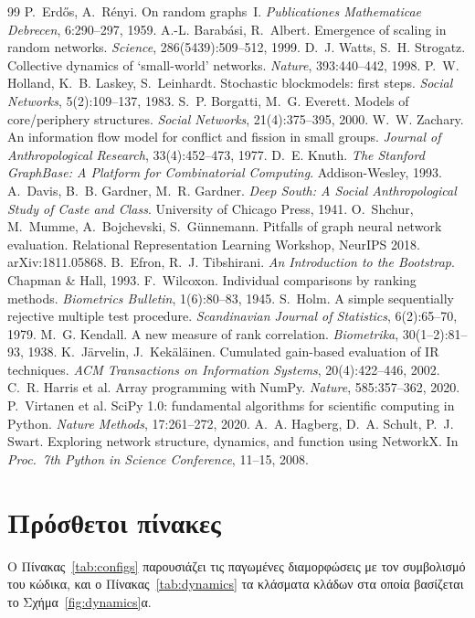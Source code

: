 \documentclass[11pt,a4paper]{article}
\theoremstyle{definition}
\theoremstyle{plain}
\begin{document}
\begin{thebibliography}{99}
 P.~Erdős, A.~Rényi. On random graphs~I. \emph{Publicationes Mathematicae Debrecen}, 6:290--297, 1959.
 A.-L. Barabási, R.~Albert. Emergence of scaling in random networks. \emph{Science}, 286(5439):509--512, 1999.
 D.~J. Watts, S.~H. Strogatz. Collective dynamics of `small-world' networks. \emph{Nature}, 393:440--442, 1998.
 P.~W. Holland, K.~B. Laskey, S.~Leinhardt. Stochastic blockmodels: first steps. \emph{Social Networks}, 5(2):109--137, 1983.
 S.~P. Borgatti, M.~G. Everett. Models of core/periphery structures. \emph{Social Networks}, 21(4):375--395, 2000.
 W.~W. Zachary. An information flow model for conflict and fission in small groups. \emph{Journal of Anthropological Research}, 33(4):452--473, 1977.
 D.~E. Knuth. \emph{The Stanford GraphBase: A Platform for Combinatorial Computing}. Addison-Wesley, 1993.
 A.~Davis, B.~B. Gardner, M.~R. Gardner. \emph{Deep South: A Social Anthropological Study of Caste and Class}. University of Chicago Press, 1941.
 O.~Shchur, M.~Mumme, A.~Bojchevski, S.~Günnemann. Pitfalls of graph neural network evaluation. Relational Representation Learning Workshop, NeurIPS 2018. arXiv:1811.05868.
 B.~Efron, R.~J. Tibshirani. \emph{An Introduction to the Bootstrap}. Chapman \& Hall, 1993.
 F.~Wilcoxon. Individual comparisons by ranking methods. \emph{Biometrics Bulletin}, 1(6):80--83, 1945.
 S.~Holm. A simple sequentially rejective multiple test procedure. \emph{Scandinavian Journal of Statistics}, 6(2):65--70, 1979.
 M.~G. Kendall. A new measure of rank correlation. \emph{Biometrika}, 30(1--2):81--93, 1938.
 K.~Järvelin, J.~Kekäläinen. Cumulated gain-based evaluation of IR techniques. \emph{ACM Transactions on Information Systems}, 20(4):422--446, 2002.
 C.~R. Harris et al. Array programming with NumPy. \emph{Nature}, 585:357--362, 2020.
 P.~Virtanen et al. SciPy 1.0: fundamental algorithms for scientific computing in Python. \emph{Nature Methods}, 17:261--272, 2020.
 A.~A. Hagberg, D.~A. Schult, P.~J. Swart. Exploring network structure, dynamics, and function using NetworkX. In \emph{Proc.\ 7th Python in Science Conference}, 11--15, 2008.
\end{thebibliography}

\appendix
\section{Πρόσθετοι πίνακες}\label{app:tables}

Ο Πίνακας~\ref{tab:configs} παρουσιάζει τις παγωμένες διαμορφώσεις με τον συμβολισμό του κώδικα, και ο Πίνακας~\ref{tab:dynamics} τα κλάσματα κλάδων στα οποία βασίζεται το Σχήμα~\ref{fig:dynamics}α.

\TabConfigs

\TabDynamics
\end{document}
